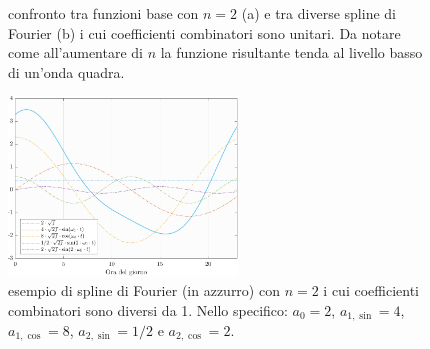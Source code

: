 \begin{figure}[htp]
	\centering
	\quad
	\caption[Confronto tra funzioni base con $n=2$ e tra diverse spline di Fourier]{confronto tra funzioni base con $n=2$ (a) e tra diverse spline di Fourier (b) i cui coefficienti combinatori sono unitari. Da notare come all'aumentare di $n$ la funzione risultante tenda al livello basso di un'onda quadra.}
	\label{esempi_Fourier}
\end{figure}
\begin{figure}[htp]
	\centering
	\includegraphics[height=180px]{Immagini/Modello base/Spline Fourier con coefficienti non unitari}
	\caption[Esempio di spline di Fourier con $n=2$ i cui coefficienti combinatori sono diversi da \num{1}]{esempio di spline di Fourier (in azzurro) con $n=2$ i cui coefficienti combinatori sono diversi da \num{1}. Nello specifico: $a_0 = 2$, $a_{1,\sin} = 4$, $a_{1,\cos} = 8$, $a_{2,\sin} = 1/2$ e $a_{2,\cos} = 2$.}
	\label{esempio_Fourier_coef_non_unitari}
\end{figure}

